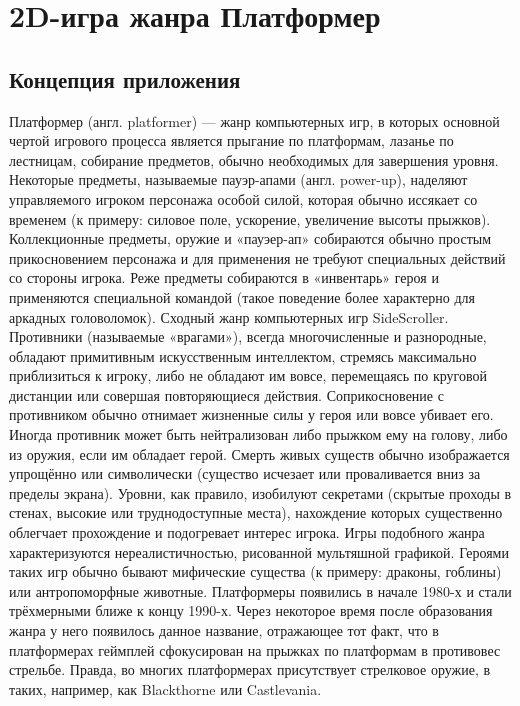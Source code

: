 





\tableofcontents
\newpage



\section{2D-игра жанра Платформер }

\subsection{Концепция приложения}

Платформер (англ. platformer) — жанр компьютерных игр, в которых основной чертой игрового процесса является прыгание по платформам, лазанье по лестницам, собирание предметов, обычно необходимых для завершения уровня. Некоторые предметы, называемые пауэр-апами (англ. power-up), наделяют управляемого игроком персонажа особой силой, которая обычно иссякает со временем (к примеру: силовое поле, ускорение, увеличение высоты прыжков). Коллекционные предметы, оружие и «пауэер-ап» собираются обычно простым прикосновением персонажа и для применения не требуют специальных действий со стороны игрока. Реже предметы собираются в «инвентарь» героя и применяются специальной командой (такое поведение более характерно для аркадных головоломок). Сходный жанр компьютерных игр SideScroller.
Противники (называемые «врагами»), всегда многочисленные и разнородные, обладают примитивным искусственным интеллектом, стремясь максимально приблизиться к игроку, либо не обладают им вовсе, перемещаясь по круговой дистанции или совершая повторяющиеся действия. Соприкосновение с противником обычно отнимает жизненные силы у героя или вовсе убивает его. Иногда противник может быть нейтрализован либо прыжком ему на голову, либо из оружия, если им обладает герой. Смерть живых существ обычно изображается упрощённо или символически (существо исчезает или проваливается вниз за пределы экрана).
Уровни, как правило, изобилуют секретами (скрытые проходы в стенах, высокие или труднодоступные места), нахождение которых существенно облегчает прохождение и подогревает интерес игрока.
Игры подобного жанра характеризуются нереалистичностью, рисованной мультяшной графикой. Героями таких игр обычно бывают мифические существа (к примеру: драконы, гоблины) или антропоморфные животные.
Платформеры появились в начале 1980-х и стали трёхмерными ближе к концу 1990-х. Через некоторое время после образования жанра у него появилось данное название, отражающее тот факт, что в платформерах геймплей сфокусирован на прыжках по платформам в противовес стрельбе. Правда, во многих платформерах присутствует стрелковое оружие, в таких, например, как Blackthorne или Castlevania.

